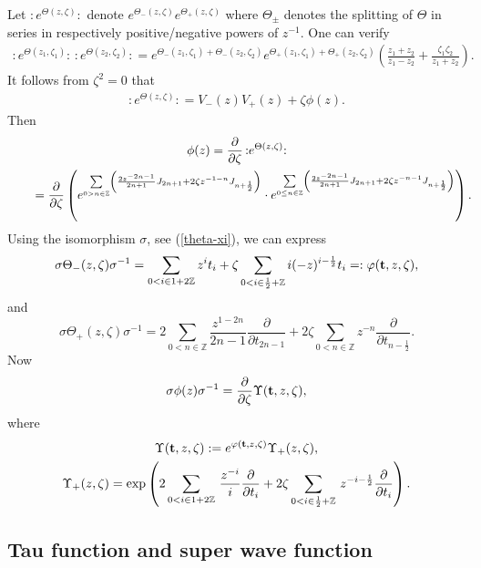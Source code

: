 \documentclass[pdftex]{sigma}
\numberwithin{equation}{section}
\newcommand{\Z}{\mathbb{Z}}
\newcommand{\INZ}[2]{\in\frac#1#2 +\mathbb{Z}}
\begin{document}
Let $ {:}e^{\Theta(z,\zeta)}{:}$ denote $
e^{\Theta_-(z,\zeta)}e^{\Theta_+(z,\zeta)}$ where $\Theta_\pm$
denotes the splitting of $\Theta$ in series in respectively
positive/negative powers of $z^{-1}$. One can verify
\begin{gather*}
{:}e^{\Theta(z_1,\zeta_1)}{:}\,{:}e^{\Theta(z_2,\zeta_2)}{:}=
 e^{\Theta_-(z_1,\zeta_1)+\Theta_-(z_2,\zeta_2)}e^{\Theta_+(z_1,\zeta_1)+\Theta_+
 (z_2,\zeta_2)}
\left(\frac{z_1+z_2}{z_1-z_2}+\frac{\zeta_1\zeta_2}{z_1+z_2}
\right) .
\end{gather*}
 It follows from $\zeta^2=0$ that
  \begin{gather} \label{super-vertex-viaVphi}
  {:}e^{\Theta(z,\zeta)}{:}= V_-(z)V_+(z)+\zeta\phi(z) .
  \end{gather}
Then
 \begin{gather}
\phi(z)  =  \frac{\partial}{\partial \zeta}\,
{:}e^{\Theta(z,\zeta)}{:}\nonumber\\
\hphantom{\phi(z)}{}
=\frac{\partial}{\partial
\zeta}\left(e^{\sum\limits_{0>n\in\Z}\left(\frac{2z^{-2n-1}}{2n+1}J_{2n+1}+
2\zeta z^{-1-n}J_{n+\frac 12}\right)}\cdot
e^{\sum\limits_{0\le n\in\Z}\left(\frac{2z^{-2n-1}}{2n+1}J_{2n+1} +
2\zeta z^{-n-1}J_{n+\frac 12}\right)}\right).\!\!\!\label{phi-Theta}
\end{gather}
Using the isomorphism $\sigma$, see (\ref{theta-xi}), we can express
\begin{gather}\label{varphi-potential}
\sigma \Theta_-(z,\zeta)\sigma^{-1}  =
\sum_{0<i\in 1+2\Z}  z^{i}t_i + \zeta
\sum_{0<i\INZ12}i(-z)^{i-\frac12}t_i =: \varphi({\bf
t},z,\zeta) ,
\end{gather}
and
\[
 \sigma \Theta_+(z,\zeta)\sigma^{-1}
= 2\sum_{0<n\in\Z} \frac{z^{1-2n}}{2n-1}\frac{\partial}{\partial
t_{2n-1}} + 2\zeta
\sum_{0<n\in\Z}{z^{-n}}\frac{\partial}{\partial t_{n-\frac 12}} .
\]
Now
 \begin{gather}\label{Bose-vertex}
\sigma \phi(z)
\sigma^{-1}=\frac{\partial}{\partial\zeta}\Upsilon({\bf
t},z,\zeta) ,
 \end{gather}
where
\begin{gather}
 \Upsilon({\bf t},z,\zeta):=e^{\varphi({\bf t},z,\zeta)} \Upsilon_+(z,\zeta) ,
\nonumber\\
\Upsilon_+(z,\zeta)=\exp \left(2\sum_{0<i\in
1+2\Z}\,\frac{z^{-i}}{i}\frac{\partial}{\partial t_i} + 2\zeta
\sum_{0<i\INZ12}\,{z^{-i-\frac12}}\frac{\partial}{\partial
t_i}\right) .\label{Upsilon+}
 \end{gather}

\subsection{Tau function and super wave function}
\end{document}
